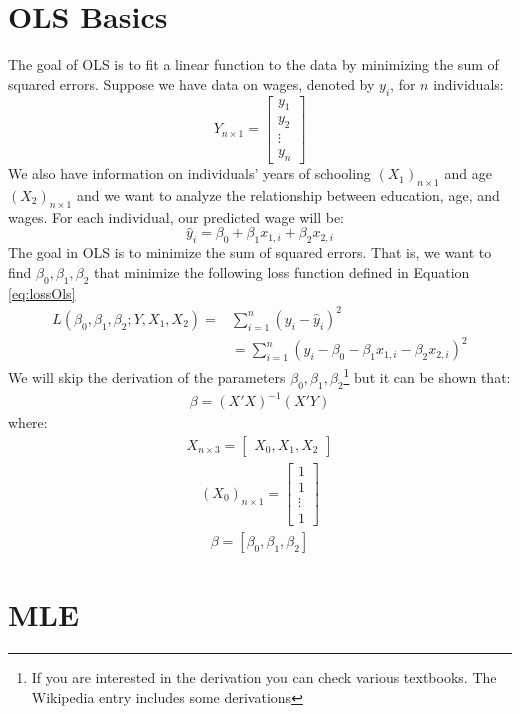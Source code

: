 \documentclass{article}
\begin{document}
\section{OLS Basics}
The goal of OLS is to fit a linear function to the data by minimizing the sum of squared errors. Suppose we have data on wages, denoted by $y_i$, for $n$ individuals:
\begin{equation}
    Y_{n\times 1}=\begin{bmatrix} y_1\\ y_2 \\ \vdots \\ y_n \end{bmatrix}
\end{equation}
We also have information on individuals' years of schooling $(X_1)_{n\times1}$ and age $(X_2)_{n\times1}$ and we want to analyze the relationship between education, age, and wages. For each individual, our predicted wage  will be:
\begin{equation}
    \hat y_i=\beta_0+\beta_1x_{1,i}+\beta_2 x_{2,i}
\end{equation}
The goal in OLS is to minimize the sum of squared errors. That is, we want to find $\beta_0,\beta_1,\beta_2$ that minimize the following loss function defined in Equation \ref{eq:lossOls}
\begin{align}\label{eq:lossOls}
    L(\beta_0,\beta_1,\beta_2;Y,X_1,X_2)= & \sum_{i=1}^n\left(y_i-\hat y_i\right)^2\nonumber \\[0.2in]
    & = \sum_{i=1}^n\left(y_i-\beta_0-\beta_1x_{1,i}-\beta_2 x_{2,i}\right)^2
\end{align}
We will skip the derivation of the parameters $\beta_0,\beta_1,\beta_2$\footnote{If you are interested in the derivation you can check various textbooks. The Wikipedia entry includes some derivations} but it can be shown that:
\begin{align}
    \beta=\left(X'X\right)^{-1}\left(X'Y\right)
\end{align}
where:
\begin{align}
    X_{n\times 3}=\begin{bmatrix}X_0,X_1,X_2\end{bmatrix}
\end{align}
\begin{align}
    (X_0)_{n\times 1}=\begin{bmatrix}1\\ 1\\ \vdots \\1\end{bmatrix}
\end{align}
\begin{align}
    \beta=\left[\beta_0,\beta_1,\beta_2\right]
\end{align}
\section{MLE}
\end{document}
